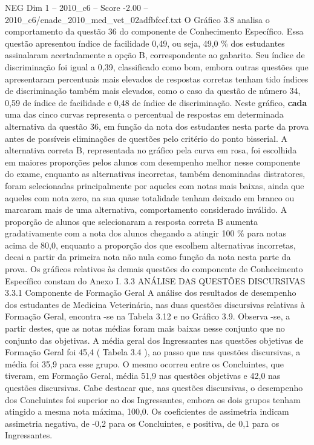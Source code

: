 \begin{textsample}{NEG Dim 1 – 2010\_c6 – Score -2.00 – 2010\_c6/enade\_2010\_med\_vet\_02adfbfccf.txt}
O Gráfico 3.8 analisa o comportamento da questão 36 do componente de Conhecimento Específico.
Essa questão apresentou índice de facilidade 0,49, ou seja, 49,0 \% dos estudantes assinalaram acertadamente a opção B, correspondente ao gabarito.
Seu índice de discriminação foi igual a 0,39, classificado como bom, embora outras questões que apresentaram percentuais mais elevados de respostas corretas tenham tido índices de discriminação também mais elevados, como o caso da questão de número 34, 0,59 de índice de facilidade e 0,48 de índice de discriminação.
Neste gráfico, \textbf{cada} uma das cinco curvas representa o percentual de respostas em determinada alternativa da questão 36, em função da nota dos estudantes nesta parte da prova antes de possíveis eliminações de questões pelo critério do ponto bisserial.
A alternativa correta B, representada no gráfico pela curva em rosa, foi escolhida em maiores proporções pelos alunos com desempenho melhor nesse componente do exame, enquanto as alternativas incorretas, também denominadas distratores, foram selecionadas principalmente por aqueles com notas mais baixas, ainda que aqueles com nota zero, na sua quase totalidade tenham deixado em branco ou marcaram mais de uma alternativa, comportamento considerado inválido.
A proporção de alunos que selecionaram a resposta correta B aumenta gradativamente com a nota dos alunos chegando a atingir 100 \% para notas acima de 80,0, enquanto a proporção dos que escolhem alternativas incorretas, decai a partir da primeira nota não nula como função da nota nesta parte da prova.
Os gráficos relativos às demais questões do componente de Conhecimento Específico constam do Anexo I. 3.3 ANÁLISE DAS QUESTÕES DISCURSIVAS 3.3.1 Componente de Formação Geral A análise dos resultados de desempenho dos estudantes de Medicina Veterinária, nas duas questões discursivas relativas à Formação Geral, encontra -se na Tabela 3.12 e no Gráfico 3.9.
Observa -se, a partir destes, que as notas médias foram mais baixas nesse conjunto que no conjunto das objetivas.
A média geral dos Ingressantes nas questões objetivas de Formação Geral foi 45,4 ( Tabela 3.4 ), ao passo que nas questões discursivas, a média foi 35,9 para esse grupo.
O mesmo ocorreu entre os Concluintes, que tiveram, em Formação Geral, média 51,9 nas questões objetivas e 42,0 nas questões discursivas.
Cabe destacar que, nas questões discursivas, o desempenho dos Concluintes foi superior ao dos Ingressantes, embora os dois grupos tenham atingido a mesma nota máxima, 100,0.
Os coeficientes de assimetria indicam assimetria negativa, de -0,2 para os Concluintes, e positiva, de 0,1 para os Ingressantes.

\end{textsample}
